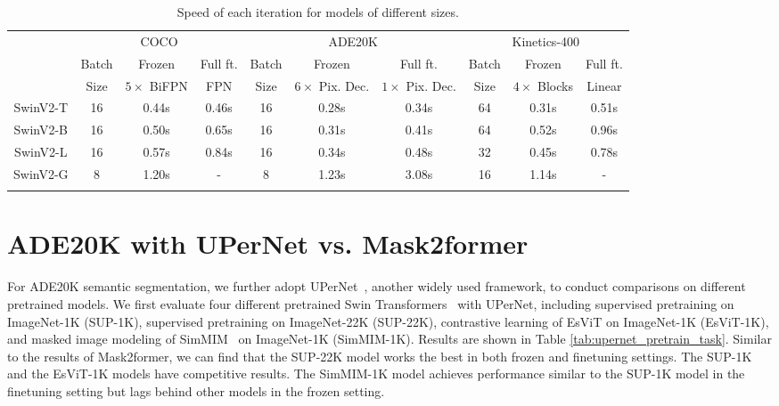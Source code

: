 \documentclass{article}
\begin{document}
\begin{table}[htb]
        \centering
        \small
        \addtolength{\tabcolsep}{-2.5pt}
        \begin{tabular}{c|ccc|ccc|ccc}
            \Xhline{1.0pt}
            \multirow{3}{*}{Base Network} & \multicolumn{3}{c|}{COCO} & \multicolumn{3}{c|}{ADE20K} & \multicolumn{3}{c}{Kinetics-400}\\
            & Batch & Frozen & Full ft. & Batch & Frozen & Full ft. & Batch & Frozen & Full ft. \\
            & Size & $5\times$ BiFPN & FPN & Size & $6\times$ Pix. Dec. & $1\times$ Pix. Dec. & Size & $4\times$  Blocks & Linear \\
            \hline
            SwinV2-T & 16 & 0.44s & 0.46s & 16 & 0.28s & 0.34s & 64 & 0.31s & 0.51s \\
            SwinV2-B & 16 & 0.50s & 0.65s & 16 & 0.31s & 0.41s & 64 & 0.52s & 0.96s \\
            SwinV2-L & 16 & 0.57s & 0.84s & 16 & 0.34s & 0.48s & 32 & 0.45s & 0.78s \\
            SwinV2-G & 8 & 1.20s & - & 8 & 1.23s & 3.08s & 16 & 1.14s & - \\
          \Xhline{1.0pt}  
       \end{tabular}
     \caption{Speed of each iteration for models of different sizes.}
     \label{tab:speed}
\end{table}

\section{ADE20K with UPerNet vs. Mask2former}

For ADE20K semantic segmentation, we further adopt UPerNet~\cite{xiao2018upernet}, another widely used framework, to conduct comparisons on different pretrained models.
We first evaluate four different pretrained Swin Transformers~\cite{liu2021swin} with UPerNet, including supervised pretraining on ImageNet-1K (SUP-1K), supervised pretraining on ImageNet-22K (SUP-22K), contrastive learning of EsViT\cite{esvit} on ImageNet-1K (EsViT-1K), and masked image modeling of SimMIM~\cite{xie2021simmim} on ImageNet-1K (SimMIM-1K). 
Results are shown in Table \ref{tab:upernet_pretrain_task}. Similar to the results of Mask2former, we can find that the SUP-22K model works the best in both frozen and finetuning settings. The SUP-1K and the EsViT-1K models have competitive results. The SimMIM-1K model achieves performance similar to the SUP-1K model in the finetuning setting but lags behind other models in the frozen setting.
\end{document}
